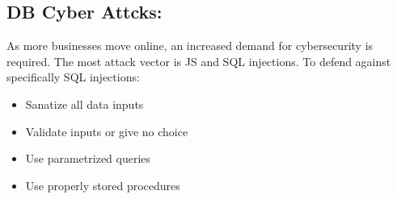 \documentclass[a5paper]{article}
\begin{document}
	\subsection{DB Cyber Attcks:}
	As more businesses move online, an increased demand for cybersecurity is required. The most attack vector is JS and SQL injections. To defend against specifically SQL injections:
	\begin{itemize}
		\item Sanatize all data inputs
		\item Validate inputs or give no choice
		\item Use parametrized queries
		\item Use properly stored procedures
	\end{itemize}
\end{document}
